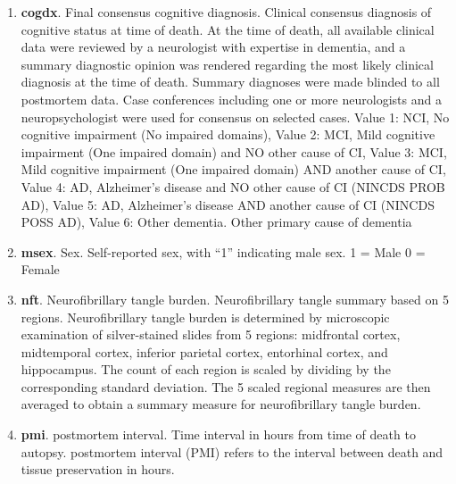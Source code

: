 \begin{enumerate}
    \item \textbf{cogdx}. Final consensus cognitive diagnosis. Clinical consensus diagnosis of cognitive status at time of death. At the time of death, all available clinical data were reviewed by a neurologist with expertise in dementia, and a summary diagnostic opinion was rendered regarding the most likely clinical diagnosis at the time of death. Summary diagnoses were made blinded to all postmortem data. Case conferences including one or more neurologists and a neuropsychologist were used for consensus on selected cases. Value 1: NCI, No cognitive impairment (No impaired domains), Value 2: MCI, Mild cognitive impairment (One impaired domain) and NO other cause of CI, Value 3: MCI, Mild cognitive impairment (One impaired domain) AND another cause of CI, Value 4: AD, Alzheimer’s disease and NO other cause of CI (NINCDS PROB AD), Value 5: AD, Alzheimer’s disease AND another cause of CI (NINCDS POSS AD), Value 6: Other dementia. Other primary cause of dementia
    \item \textbf{msex}. Sex. Self-reported sex, with “1” indicating male sex. 1 = Male 0 = Female
    \item \textbf{nft}. Neurofibrillary tangle burden. Neurofibrillary tangle summary based on 5 regions. Neurofibrillary tangle burden is determined by microscopic examination of silver-stained slides from 5 regions: midfrontal cortex, midtemporal cortex, inferior parietal cortex, entorhinal cortex, and hippocampus. The count of each region is scaled by dividing by the corresponding standard deviation. The 5 scaled regional measures are then averaged to obtain a summary measure for neurofibrillary tangle burden.
    \item \textbf{pmi}. postmortem interval. Time interval in hours from time of death to autopsy. postmortem interval (PMI) refers to the interval between death and tissue preservation in hours.
\end{enumerate}
